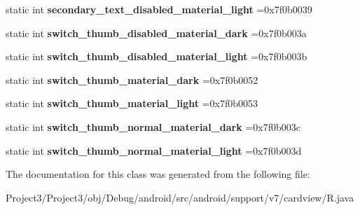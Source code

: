 \begin{DoxyCompactItemize}
static int {\bfseries secondary\+\_\+text\+\_\+disabled\+\_\+material\+\_\+light} =0x7f0b0039
\item 
\mbox{\label{classandroid_1_1support_1_1v7_1_1cardview_1_1R_1_1color_a4231741cd4fdca802d7191542f7be9ec}} 
static int {\bfseries switch\+\_\+thumb\+\_\+disabled\+\_\+material\+\_\+dark} =0x7f0b003a
\item 
\mbox{\label{classandroid_1_1support_1_1v7_1_1cardview_1_1R_1_1color_a40c972534f87faa3f1fb296cc7161b39}} 
static int {\bfseries switch\+\_\+thumb\+\_\+disabled\+\_\+material\+\_\+light} =0x7f0b003b
\item 
\mbox{\label{classandroid_1_1support_1_1v7_1_1cardview_1_1R_1_1color_a43cd761c4d644901476a219b10ab8f0b}} 
static int {\bfseries switch\+\_\+thumb\+\_\+material\+\_\+dark} =0x7f0b0052
\item 
\mbox{\label{classandroid_1_1support_1_1v7_1_1cardview_1_1R_1_1color_ac5d68cec31bdbcbcf1020e83889287b1}} 
static int {\bfseries switch\+\_\+thumb\+\_\+material\+\_\+light} =0x7f0b0053
\item 
\mbox{\label{classandroid_1_1support_1_1v7_1_1cardview_1_1R_1_1color_a6a5399c1fb82fd8a5f8ff1d5163dd9ac}} 
static int {\bfseries switch\+\_\+thumb\+\_\+normal\+\_\+material\+\_\+dark} =0x7f0b003c
\item 
\mbox{\label{classandroid_1_1support_1_1v7_1_1cardview_1_1R_1_1color_a80dd9b6f8a97fa65328c233b75a62633}} 
static int {\bfseries switch\+\_\+thumb\+\_\+normal\+\_\+material\+\_\+light} =0x7f0b003d
\end{DoxyCompactItemize}


The documentation for this class was generated from the following file\+:\begin{DoxyCompactItemize}
\item 
Project3/\+Project3/obj/\+Debug/android/src/android/support/v7/cardview/R.\+java\end{DoxyCompactItemize}
